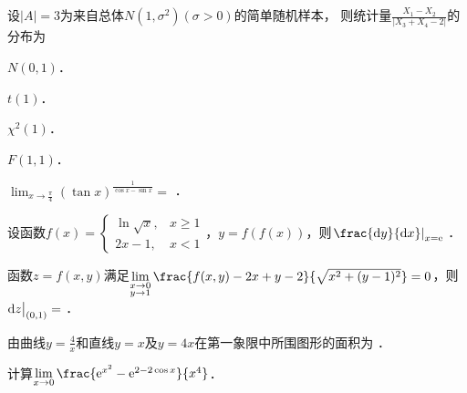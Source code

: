 \documentclass[plain,noanswer,medmath]{../../template/jnuexam}
\begin{document}
\begin{problem}
设$|A| = 3$为来自总体$N\left(1,\sigma^2 \right)\left(\sigma > 0 \right)$的简单随机样本，
则统计量$\frac{X_1 - X_2}{\left| X_3 + X_4 - 2 \right|}$的分布为\pickout{}
\begin{abcd}
\item $N\left(0,1 \right)$．
\item $t(1)$．
\item $\chi^2(1)$．
\item $F\left(1,1 \right)$．
\end{abcd}
\end{problem}




\begin{problem}
$\lim_{x \to \frac{\pi}{4}} \left(\tan x \right)^{\frac{1}{\cos x - \sin x}} =$ \fillin{}．
\end{problem}


\begin{problem}
设函数$f(x) = \begin{cases}
  \ln \sqrt{x} , & x \ge 1 \\
         2x - 1, & x < 1
\end{cases}$，$y=f(f(x))$，则$\left.\frac{\dy}{\dx}\right|_{x=\e}$ \fillin{}．
\end{problem}


\begin{problem}
函数$z = f(x,y)$满足$\lim_{\begin{subarray}{l}
  x \to 0 \\
  y \to 1
\end{subarray}} \frac{f(x,y) - 2x + y - 2}{\sqrt{x^2 + (y - 1)^2}} = 0$，则$\mathop{}\!\mathrm{d} z\big|_{(0,1)} =$ \fillin{}．
\end{problem}


\begin{problem}
由曲线$y = \frac{4}{x}$和直线$y = x$及$y = 4x$在第一象限中所围图形的面积为 \fillin{}．
\end{problem}








\begin{problem}[points=10]
计算$\lim_{x \to 0} \frac{\e^{x^2} - \e^{2 - 2\cos x}}{x^4}$．
\end{problem}
\end{document}
